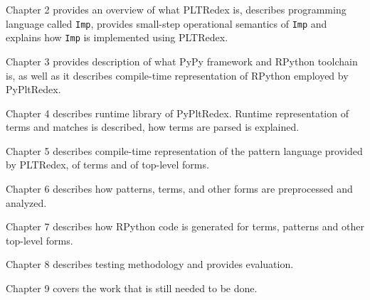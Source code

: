 Chapter 2 provides an overview of what PLTRedex is, describes programming language called \texttt{Imp}, provides small-step operational semantics of \texttt{Imp} and explains how \texttt{Imp} is implemented using PLTRedex.

Chapter 3 provides description of what PyPy framework and RPython toolchain is, as well as it describes compile-time representation of RPython employed by PyPltRedex.

Chapter 4 describes runtime library of PyPltRedex. Runtime representation of terms and matches is described, how terms are parsed is explained.

Chapter 5 describes compile-time representation of the pattern language provided by PLTRedex, of terms and of top-level forms.

Chapter 6 describes how patterns, terms, and other forms are preprocessed and analyzed.

Chapter 7 describes how RPython code is generated for terms, patterns and other top-level forms.

Chapter 8 describes testing methodology and provides evaluation. 

Chapter 9 covers the work that is still needed to be done.

